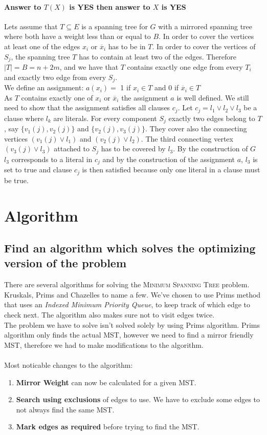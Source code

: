 \documentclass[12pt]{report}
\begin{document}
\subsubsection{Answer to $T(X)$ is YES then answer to $X$ is YES}
Lets assume that $T \subseteq E$ is a spanning tree for $G$ with a mirrored spanning tree where both have a weight less than or equal to $B$. In order to cover the vertices at least one of the edges $x_i$ or $\overline{x}_i$ has to be in $T$. In order to cover the vertices of $S_j$, the spanning tree $T$ has to contain at least two of the edges. Therefore $|T| = B = n + 2m$, and we have that $T$ contains exactly one edge from every $T_i$ and exactly two edge from every $S_j$.\\
We define an assignment: $a(x_i) =$ 1 if $x_i \in T$ and 0 if $\overline{x}_i \in T$\\
As $T$ contains exactly one of $x_i$ or $\overline{x}_i$ the assignment $a$ is well defined. We still need to show that the assignment satisfies all clauses $c_j$. Let $c_j = l_1 \vee l_2 \vee l_3$ be a clause where $l_k$ are literals. For every component $S_j$ exactly two edges belong to $T$, say $\{v_1(j),v_2(j)\}$ and $\{v_2(j),v_3(j)\}$. They cover also the connecting vertices $(v_1(j) \vee l_1)$ and $(v_2(j) \vee l_2)$. The third connecting vertex $(v_3(j) \vee l_3)$ attached to $S_j$ has to be covered by $l_3$. By the construction of $G$ $l_3$ corresponds to a literal in $c_j$ and by the construction of the assignment $a$, $l_3$ is set to true and clause $c_j$ is then satisfied because only one literal in a clause must be true.

\chapter{Algorithm}
\section{Find an algorithm which solves the optimizing version of the problem}
\label{sec:alg1}
There are several algorithms for solving the \textsc{Minimum Spanning Tree} problem.  Kruskals, Prims and Chazelles to name a few. We've chosen to use Prims method that uses an \emph{Indexed Minimum Priority Queue}, to keep track of which edge to check next. The algorithm also makes sure not to visit edges twice.\\
The problem we have to solve isn't solved solely by using Prims algorithm. Prims algorithm only finds the actual MST, however we need to find a mirror friendly MST, therefore we had to make modifications to the algorithm.\\
\\
Most noticable changes to the algorithm:
\begin{enumerate}
	\item[] \textbf{Mirror Weight} can now be calculated for a given MST.
	\item[] \textbf{Search using exclusions} of edges to use. We have to exclude some edges to not always find the same MST.
	\item[] \textbf{Mark edges as required} before trying to find the MST.
\end{enumerate}
\end{document}
